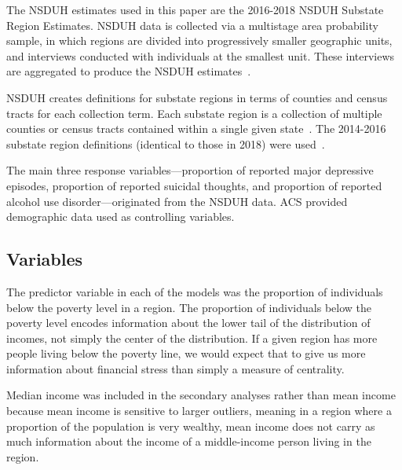 \documentclass{article}
\begin{document}
The NSDUH estimates used in this paper are the
2016-2018 NSDUH Substate Region Estimates.
NSDUH data is collected via a multistage area probability sample,
in which regions are divided
into progressively smaller geographic units,
and interviews conducted with individuals at the smallest unit.
These interviews are aggregated to produce the NSDUH
estimates~\cite{nsduh_description}.

NSDUH creates definitions for substate regions in terms of
counties and census tracts for each collection term.
Each substate region is a collection of multiple
counties or census tracts contained within a single
given state~\cite{samhsa_substate_region_defs}.
The 2014-2016 substate region definitions
(identical to those in 2018)
were used~\cite{samhsa_substate_region_defs}.

The main three response
variables---proportion of reported major depressive episodes,
proportion of reported suicidal thoughts,
and proportion of reported alcohol use disorder---originated
from the NSDUH data.
ACS provided demographic data used as controlling variables.

\subsection{Variables}\label{sec:finalvars}

The predictor variable in each of the
models was the proportion of individuals below the poverty level in a region.
The proportion of individuals below the
poverty level encodes information about the lower tail of the
distribution of incomes, not simply the center of the distribution.
If a given region has more people living below the poverty line, we
would expect that to give us more information about financial stress
than simply a measure of centrality.

Median income was included in the secondary analyses rather than mean
income because mean income is sensitive to larger outliers, meaning in a
region where a proportion of the population is very wealthy, mean income
does not carry as much information about the income of a middle-income person
living in the region.
\end{document}
